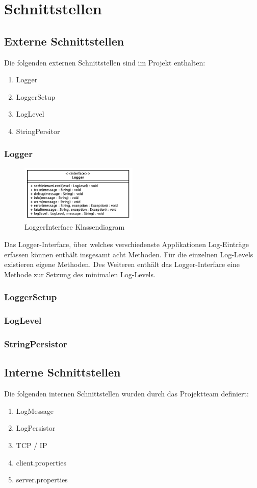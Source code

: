 \section{Schnittstellen}
\subsection{Externe Schnittstellen}
Die folgenden externen Schnittstellen sind im Projekt enthalten:
\begin{enumerate}
	\item Logger
	\item LoggerSetup
	\item LogLevel
	\item StringPersitor
\end{enumerate}

\subsubsection{Logger}
\begin{figure}[H]
	\centering
	\includegraphics[width=0.5\textwidth]{3_Schnittstellen/Bilder/loggerInterface.png}
	\caption{LoggerInterface Klassendiagram}
	\label{fig:LoggerInterface Klassendiagramm}
\end{figure}
Das Logger-Interface, über welches verschiedenste Applikationen Log-Einträge erfassen können enthält insgesamt acht Methoden. Für die einzelnen Log-Levels existieren eigene Methoden. Des Weiteren enthält das Logger-Interface eine Methode zur Setzung des minimalen Log-Levels. 
\subsubsection{LoggerSetup}
\subsubsection{LogLevel}
\subsubsection{StringPersistor}

\subsection{Interne Schnittstellen}
Die folgenden internen Schnittstellen wurden durch das Projektteam definiert: 
\begin{enumerate}
	\item LogMessage
	\item LogPersistor
	\item TCP / IP
	\item client.properties
	\item server.properties
\end{enumerate}

